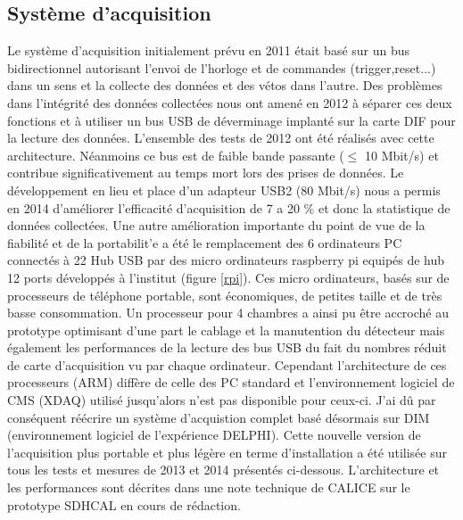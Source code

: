 \documentclass[9pt,french]{article}
\begin{document}
\subsection*{Syst\`eme d'acquisition}
Le syst\`eme d'acquisition initialement pr\'evu en 2011 \'etait bas\'e sur un bus bidirectionnel autorisant l'envoi de l'horloge et de commandes (trigger,reset...) dans un sens et la collecte des donn\'ees et des v\'etos dans l'autre. Des probl\`emes dans l'int\'egrit\'e des donn\'ees collect\'ees nous ont amen\'e en 2012 \`a s\'eparer ces deux fonctions et \`a utiliser un bus USB de d\'everminage implant\'e sur la carte DIF pour la lecture des donn\'ees. L'ensemble des tests de 2012 ont \'et\'e r\'ealis\'es avec cette architecture. N\'eanmoins ce bus est de faible bande passante ($\le$ 10 Mbit/s) et contribue significativement au temps mort lors des prises de donn\'ees. Le d\'eveloppement en lieu et place  d'un adapteur USB2 (80 Mbit/s) nous a permis en 2014 d'am\'eliorer l'efficacit\'e d'acquisition de 7 a 20 \% et donc la statistique de donn\'ees collect\'ees. Une autre am\'elioration importante du point de vue de la fiabilit\'e et de la portabilit'e a \'et\'e le remplacement des 6 ordinateurs PC connect\'es \`a 22 Hub USB par des micro ordinateurs raspberry pi equip\'es de hub 12 ports d\'evelopp\'es \`a l'institut (figure \ref{rpi}). Ces micro ordinateurs, bas\'es sur de processeurs de t\'el\'ephone portable, sont \'economiques, de petites taille et de tr\`es basse consommation. Un processeur pour 4 chambres a ainsi pu \^etre accroch\'e au prototype optimisant d'une part le cablage et la manutention du d\'etecteur mais \'egalement les performances de la lecture des bus USB du fait du nombres r\'eduit de carte d'acquisition vu par chaque ordinateur. Cependant l'architecture de ces processeurs (ARM) diff\`ere de celle des PC standard et  l'environnement logiciel de CMS (XDAQ) utilis\'e jusqu'alors n'est pas disponible pour ceux-ci. J'ai d\^u par cons\'equent r\'e\'ecrire un syst\`eme d'acquistion complet bas\'e d\'esormais sur DIM (environnement logiciel de l'exp\'erience DELPHI). Cette nouvelle version de l'acquisition plus portable et plus l\'eg\`ere en terme d'installation a \'et\'e utilis\'ee sur tous les tests et mesures de 2013 et 2014 pr\'esent\'es ci-dessous. L'architecture et les performances sont d\'ecrites dans une note technique de CALICE sur le prototype SDHCAL en cours de r\'edaction.       
\end{document}
